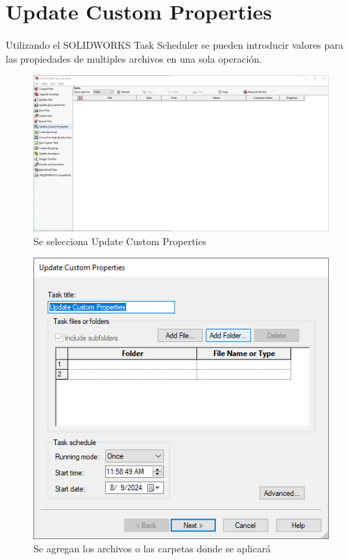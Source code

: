 \documentclass[12pt,letterpaper,final]{report}
\begin{document}
\chapter{Update Custom Properties}

Utilizando el SOLIDWORKS Task Scheduler se pueden introducir valores para las propiedades de multiples archivos en una sola operación.

\begin{figure}[H]
	\centering
	\includegraphics[width=0.85\linewidth, height=0.5\textheight,keepaspectratio]{Imagenes/solidworks_updatecustomprop01}
	\caption{Se selecciona Update Custom Properties}
	\label{fig:solidworksupdatecustomprop01}
\end{figure}

\begin{figure}[H]
	\centering
	\includegraphics[width=0.65\linewidth, height=0.35\textheight,keepaspectratio]{Imagenes/solidworks_updatecustomprop02}
	\caption{Se agregan los archivos o las carpetas donde se aplicará}
	\label{fig:solidworksupdatecustomprop02}
\end{figure}
\end{document}

